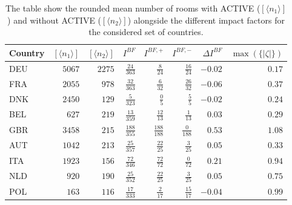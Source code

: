 \documentclass[fleqn,usenatbib,nofootinbib]{revtex4-2}
\begin{document}
	\begin{table}[H]
		\centering
		\caption{The table show the rounded mean number of rooms with ACTIVE ($[\langle n_1\rangle]$) and without ACTIVE ($[\langle n_2\rangle]$) alongside the different impact factors for the considered set of countries.}
		\label{tab:results0}
		\begin{tabular}{l r r r r r r r}
			\hline
			Country  &$[\langle n_1\rangle]$ & $[\langle n_2\rangle]$ & $I^{BF}$ & $I^{BF,+}$ & $I^{BF,-}$ & $\Delta I^{BF}$ & $\max(\{|\zeta|\})$\\
			\hline
			\hline
			DEU &                    $5067$ &                    $2275$ &   $\frac{24}{363}$ &     $\frac{8}{24}$ &  $\frac{16}{24}$ &          $-0.02$ &                $0.17$ \\
			FRA &                    $2055$ &                     $978$ &   $\frac{32}{363}$ &     $\frac{6}{32}$ &   $\frac{26}{32}$ &          $-0.06$ &                $0.37$ \\
			DNK &                    $2450$ &                     $129$ &    $\frac{5}{323}$ &      $\frac{0}{5}$ &    $\frac{5}{5}$ &          $-0.02$ &                $0.24$ \\
			BEL &                     $627$ &                     $219$ &   $\frac{13}{359}$ &    $\frac{12}{13}$ &   $\frac{1}{13}$ &           $0.03$ &                $0.29$ \\
			GBR &                    $3458$ &                     $215$ &  $\frac{188}{355}$ &  $\frac{188}{188}$ &  $\frac{0}{188}$ &            $0.53$ &                $1.08$ \\
			AUT &                    $1042$ &                     $213$ &   $\frac{25}{357}$ &    $\frac{22}{25}$ &   $\frac{3}{25}$ &           $0.05$ &                $0.33$ \\
			ITA &                    $1923$ &                     $156$ &   $\frac{72}{346}$ &    $\frac{72}{72}$ &   $\frac{0}{72}$ &           $0.21$ &                $0.94$ \\
			NLD &                     $920$ &                     $190$ &    $\frac{25}{352}$ &      $\frac{22}{25}$ &    $\frac{3}{25}$ &           $0.05$ &               $ 0.75$ \\
			POL &                     $163$ &                     $116$ &   $\frac{17}{333}$ &     $\frac{2}{17}$ &  $\frac{15}{17}$ &          $-0.04$ &                $0.99$ \\
			\hline
			\hline
		\end{tabular}
	\end{table}
\end{document}
